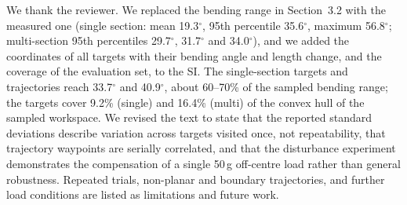\documentclass[10pt,a4paper]{article}
\begin{document}
\begin{resp}
We thank the reviewer. We replaced the bending range in Section~3.2 with the measured one (single section: mean 19.3$^\circ$, 95th percentile 35.6$^\circ$, maximum 56.8$^\circ$; multi-section 95th percentiles 29.7$^\circ$, 31.7$^\circ$ and 34.0$^\circ$), and we added the coordinates of all targets with their bending angle and length change, and the coverage of the evaluation set, to the SI. The single-section targets and trajectories reach 33.7$^\circ$ and 40.9$^\circ$, about 60--70\% of the sampled bending range; the targets cover 9.2\% (single) and 16.4\% (multi) of the convex hull of the sampled workspace. We revised the text to state that the reported standard deviations describe variation across targets visited once, not repeatability, that trajectory waypoints are serially correlated, and that the disturbance experiment demonstrates the compensation of a single 50\,g off-centre load rather than general robustness. Repeated trials, non-planar and boundary trajectories, and further load conditions are listed as limitations and future work.
\end{resp}
\end{document}
